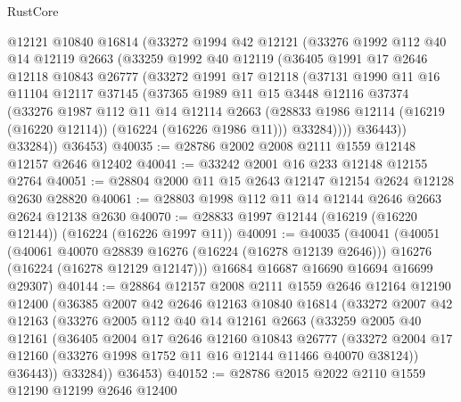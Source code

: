 \begin{lexlean}{RustCore}
\begin{coremodule}
      @12121
      @10840
      @16814
      (@33272
        @1994
        @42
        @12121
        (@33276
          @1992
          @112
          @40
          @14
          @12119
          @2663
          (@33259
            @1992
            @40
            @12119
            (@36405
              @1991
              @17
              @2646
              @12118
              @10843
              @26777
              (@33272
                @1991
                @17
                @12118
                (@37131
                  @1990
                  @11
                  @16
                  @11104
                  @12117
                  @37145
                  (@37365
                    @1989
                    @11
                    @15
                    @3448
                    @12116
                    @37374
                    (@33276
                      @1987
                      @112
                      @11
                      @14
                      @12114
                      @2663
                      (@28833 @1986 @12114 (@16219 (@16220 @12114)) (@16224 (@16226 @1986 @11)))
                      @33284))))
              @36443))
          @33284))
      @36453)
@40035 := @28786 @2002 @2008 @2111 @1559 @12148 @12157 @2646 @12402
@40041 := @33242 @2001 @16 @233 @12148 @12155 @2764
@40051 := @28804 @2000 @11 @15 @2643 @12147 @12154 @2624 @12128 @2630 @28820
@40061 := @28803 @1998 @112 @11 @14 @12144 @2646 @2663 @2624 @12138 @2630
@40070 := @28833 @1997 @12144 (@16219 (@16220 @12144)) (@16224 (@16226 @1997 @11))
@40091 := @40035
    (@40041
      (@40051
        (@40061 @40070 @28839 @16276 (@16224 (@16278 @12139 @2646)))
        @16276
        (@16224 (@16278 @12129 @12147)))
      @16684
      @16687
      @16690
      @16694
      @16699
      @29307)
@40144 := @28864
    @12157
    @2008
    @2111
    @1559
    @2646
    @12164
    @12190
    @12400
    (@36385
      @2007
      @42
      @2646
      @12163
      @10840
      @16814
      (@33272
        @2007
        @42
        @12163
        (@33276
          @2005
          @112
          @40
          @14
          @12161
          @2663
          (@33259
            @2005
            @40
            @12161
            (@36405
              @2004
              @17
              @2646
              @12160
              @10843
              @26777
              (@33272 @2004 @17 @12160 (@33276 @1998 @1752 @11 @16 @12144 @11466 @40070 @38124))
              @36443))
          @33284))
      @36453)
@40152 := @28786 @2015 @2022 @2110 @1559 @12190 @12199 @2646 @12400

\end{coremodule}
\end{lexlean}
